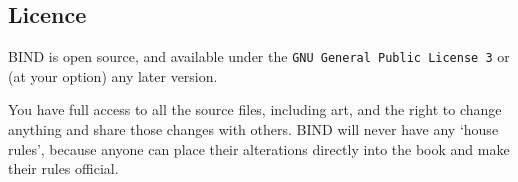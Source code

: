 \begin{multicols}{2}
\subsection*{Licence}

BIND is open source, and available under the {\tt GNU General Public License 3} or (at your option) any later version.

You have full access to all the source files, including art, and the right to change anything and share those changes with others.
BIND will never have any `house rules', because anyone can place their alterations directly into the book and make their rules official.

\end{multicols}
